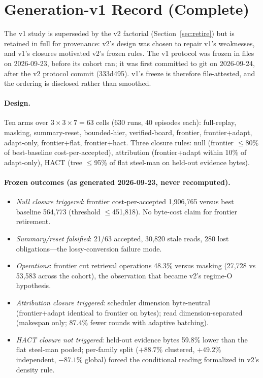 \section{Generation-v1 Record (Complete)}\label{app:retire-v1}
The v1 study is superseded by the v2 factorial
(Section~\ref{sec:retire}) but is retained in full for provenance: v2's
design was chosen to repair v1's weaknesses, and v1's closures
motivated v2's frozen rules. The v1 protocol was frozen in files on
2026-09-23, before its cohort ran; it was first committed to git on 2026-09-24, after the v2 protocol commit
(333d495). v1's freeze is
therefore file-attested, and the ordering is disclosed rather than
smoothed.

\paragraph{Design.} Ten arms over $3\times3\times7=63$ cells (630
runs, 40 episodes each): full-replay, masking, summary-reset,
bounded-hier, verified-board, frontier, frontier+adapt, adapt-only,
frontier+flat, frontier+hact. Three closure rules: null (frontier
$\le$80\% of best-baseline cost-per-accepted), attribution (frontier+adapt
within 10\% of adapt-only), HACT (tree $\le$95\% of flat steel-man on
held-out evidence bytes).

\paragraph{Frozen outcomes (as generated 2026-09-23, never
recomputed).}
\begin{itemize}[leftmargin=*,itemsep=1pt]
\item \emph{Null closure triggered}: frontier cost-per-accepted
1{,}906{,}765 versus best baseline 564{,}773 (threshold $\le$451{,}818).
No byte-cost claim for frontier retirement.
\item \emph{Summary/reset falsified}: 21/63 accepted, 30{,}820 stale
reads, 280 lost obligations---the lossy-conversion failure mode.
\item \emph{Operations}: frontier cut retrieval operations 48.3\%
versus masking (27{,}728 vs 53{,}583 across the cohort), the
observation that became v2's regime-O hypothesis.
\item \emph{Attribution closure triggered}: scheduler dimension
byte-neutral (frontier+adapt identical to frontier on bytes); read
dimension-separated (makespan only; 87.4\% fewer rounds with adaptive
batching).
\item \emph{HACT closure not triggered}: held-out evidence bytes 59.8\%
lower than the flat steel-man pooled; per-family split
($+88.7\%$ clustered, $+49.2\%$ independent, $-87.1\%$ global) forced
the conditional reading formalized in v2's density rule.
\end{itemize}

